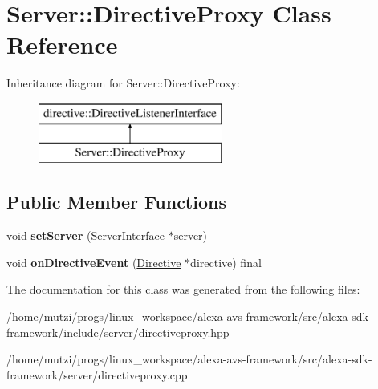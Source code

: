 \hypertarget{classServer_1_1DirectiveProxy}{}\section{Server\+:\+:Directive\+Proxy Class Reference}
\label{classServer_1_1DirectiveProxy}
Inheritance diagram for Server\+:\+:Directive\+Proxy\+:\begin{figure}[H]
\begin{center}
\leavevmode
\includegraphics[height=2.000000cm]{df/dc3/classServer_1_1DirectiveProxy}
\end{center}
\end{figure}
\subsection*{Public Member Functions}
\begin{DoxyCompactItemize}
\item 
\mbox{\label{classServer_1_1DirectiveProxy_a69df62657e90e0c9257373ea52e1c618}} 
void {\bfseries set\+Server} (\hyperlink{classServer_1_1ServerInterface}{Server\+Interface} $\ast$server)
\item 
\mbox{\label{classServer_1_1DirectiveProxy_adf51b15d7bbbf1d99dce22a8b5d1c3eb}} 
void {\bfseries on\+Directive\+Event} (\hyperlink{classdirective_1_1Directive}{Directive} $\ast$directive) final
\end{DoxyCompactItemize}


The documentation for this class was generated from the following files\+:\begin{DoxyCompactItemize}
\item 
/home/mutzi/progs/linux\+\_\+workspace/alexa-\/avs-\/framework/src/alexa-\/sdk-\/framework/include/server/directiveproxy.\+hpp\item 
/home/mutzi/progs/linux\+\_\+workspace/alexa-\/avs-\/framework/src/alexa-\/sdk-\/framework/server/directiveproxy.\+cpp\end{DoxyCompactItemize}
